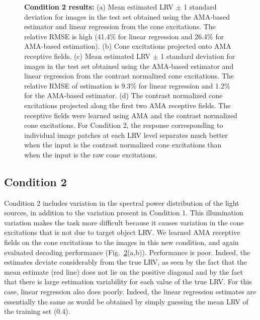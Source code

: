 \documentclass{jov}
\begin{document}
\begin{figure}
\begin{subfigure}[b]{0.22 \textwidth}
        \label{fig:case2RFResponseContrast}
    \end{subfigure}
    \caption{{\bf Condition 2 results:} (a) Mean estimated LRV $\pm$ 1 standard deviation for images in the test set obtained using the AMA-based estimator and linear regression from the cone excitations. The relative RMSE is high (41.4\% for linear regression and 26.4\% for AMA-based estimation). (b) Cone excitations projected onto AMA receptive fields. (c) Mean estimated LRV $\pm$ 1 standard deviation for images in the test set obtained using the AMA-based estimator and linear regression from the contrast normalized cone excitations. The relative RMSE of estimation is 9.3\% for linear regression and 1.2\% for the AMA-based estimator. (d) The contrast normalized cone excitations projected along the first two AMA receptive fields. The receptive fields were learned using AMA and the contrast normalized cone excitations. For Condition 2, the response corresponding to individual image patches at each LRV level separates much better when the input is the contrast normalized cone excitations than when the input is the raw cone excitations.}
\label{fig:Condition2}
\end{figure}

\subsection{Condition 2}

Condition 2 includes variation in the spectral power distribution of the light sources, in addition to the variation present in Condition 1. 
This illumination variation makes the task more difficult because it causes variation in the cone excitations that is not due to target object LRV. 
We learned AMA receptive fields on the cone excitations to the images in this new condition, and again evaluated decoding performance (Fig.~\ref{fig:Condition2}(a,b)). 
Performance is poor.
Indeed, the estimates deviate considerably from the true LRV, as seen by the fact that the mean estimate
(red line) does not lie on the positive diagonal and by the fact that there is large estimation variability for each
value of the true LRV.
For this case, linear regression also does poorly. Indeed, the linear regression estimates are essentially the same as would be obtained
by simply guessing the mean LRV of the training set (0.4).
\end{document}
